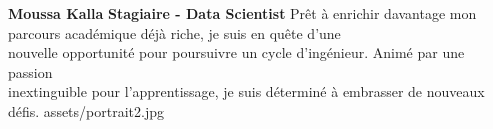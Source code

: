\documentclass[theme]{cv_einstein}
\begin{document}
    \header
    {\textbf{Moussa Kalla}}
    {\textbf{Stagiaire - Data Scientist }}
    { 
Prêt à enrichir davantage mon parcours académique déjà riche, je suis en quête d'une \\ nouvelle opportunité pour poursuivre un cycle d'ingénieur. Animé par une passion \\ inextinguible pour l'apprentissage, je suis déterminé à embrasser de nouveaux défis.
    }
    {assets/portrait2.jpg}


    \vspace{\headerheight} %
\end{document}
